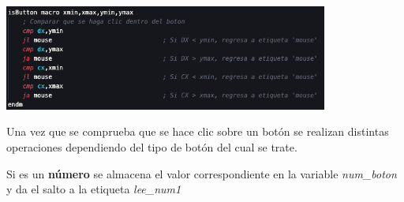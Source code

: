 \documentclass[letterpaper,12 pt,titlepage]{article}
\begin{document}
    \begin{center}
        \includegraphics[width=0.8\textwidth]{img/19.png}
    \end{center}

    Una vez que se comprueba que se hace clic sobre un botón se realizan distintas operaciones dependiendo del tipo de botón del cual se trate.

    Si es un \textbf{número} se almacena el valor correspondiente en la variable \textit{num\_boton} y da el salto a la etiqueta \textit{lee\_num1}
\end{document}
